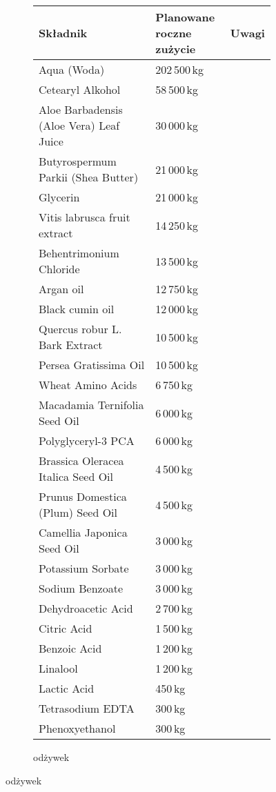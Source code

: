 {\begin{figure}[H]
\begin{footnotesize}
	\begin{subfigure}{0.7\textwidth}
		\centering
		\caption{odżywek}
		\begin{tabular}{p{}ll}
			\hline
			\textbf{Składnik} & \makecell[l]{\textbf{Planowane} \\ \textbf{roczne zużycie}} & \textbf{Uwagi} \\
			\hline\hline
			Aqua (Woda) & 202\,500\,kg & \\
			Cetearyl Alkohol & 58\,500\,kg & \\
			Aloe Barbadensis (Aloe Vera) Leaf Juice & 30\,000\,kg & \\
			Butyrospermum Parkii (Shea Butter) & 21\,000\,kg & \\
			Glycerin & 21\,000\,kg & \\
			Vitis labrusca fruit extract & 14\,250\,kg & \\
			Behentrimonium Chloride & 13\,500\,kg & \\
			Argan oil & 12\,750\,kg & \\
			Black cumin oil & 12\,000\,kg & \\
			Quercus robur L. Bark Extract & 10\,500\,kg & \\
			Persea Gratissima Oil & 10\,500\,kg & \\
			Wheat Amino Acids & 6\,750\,kg & \\
			Macadamia Ternifolia Seed Oil & 6\,000\,kg & \\
			Polyglyceryl-3 PCA & 6\,000\,kg & \\
			Brassica Oleracea Italica Seed Oil & 4\,500\,kg & \\
			Prunus Domestica (Plum) Seed Oil & 4\,500\,kg & \\
			Camellia Japonica Seed Oil & 3\,000\,kg & \\
			Potassium Sorbate & 3\,000\,kg & \\
			Sodium Benzoate & 3\,000\,kg & \\
			Dehydroacetic Acid & 2\,700\,kg & \\
			Citric Acid & 1\,500\,kg & \\
			Benzoic Acid & 1\,200\,kg & \\
			Linalool & 1\,200\,kg & \\
			Lactic Acid & 450\,kg & \\
			Tetrasodium EDTA & 300\,kg & \\
			Phenoxyethanol & 300\,kg & \\
			\hline
		\end{tabular}
	\end{subfigure}
\end{footnotesize}
\end{figure}
}

